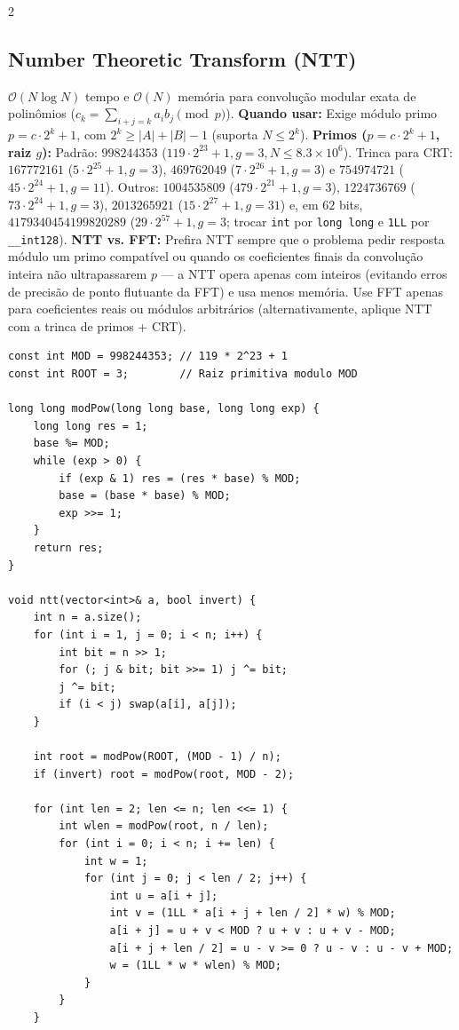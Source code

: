 \documentclass[11pt]{article}
\begin{document}
\begin{multicols}{2}
\subsection{Number Theoretic Transform (NTT)}
$\mathcal{O}(N \log N)$ tempo e $\mathcal{O}(N)$ memória para convolução modular exata de polinômios ($c_k = \sum_{i+j=k} a_i b_j \pmod p$). \textbf{Quando usar:} Exige módulo primo $p = c \cdot 2^k + 1$, com $2^k \ge |A| + |B| - 1$ (suporta $N \le 2^k$). \textbf{Primos ($p = c \cdot 2^k + 1$, raiz $g$):} Padrão: $998244353$ ($119 \cdot 2^{23} + 1, g = 3, N \le 8.3 \times 10^6$). Trinca para CRT: $167772161$ ($5 \cdot 2^{25} + 1, g = 3$), $469762049$ ($7 \cdot 2^{26} + 1, g = 3$) e $754974721$ ($45 \cdot 2^{24} + 1, g = 11$). Outros: $1004535809$ ($479 \cdot 2^{21} + 1, g = 3$), $1224736769$ ($73 \cdot 2^{24} + 1, g = 3$), $2013265921$ ($15 \cdot 2^{27} + 1, g = 31$) e, em $62$ bits, $4179340454199820289$ ($29 \cdot 2^{57} + 1, g = 3$; trocar \texttt{int} por \texttt{long long} e \texttt{1LL} por \texttt{\_\_int128}). \textbf{NTT vs. FFT:} Prefira NTT sempre que o problema pedir resposta módulo um primo compatível ou quando os coeficientes finais da convolução inteira não ultrapassarem $p$ — a NTT opera apenas com inteiros (evitando erros de precisão de ponto flutuante da FFT) e usa menos memória. Use FFT apenas para coeficientes reais ou módulos arbitrários (alternativamente, aplique NTT com a trinca de primos + CRT).
\begin{lstlisting}
const int MOD = 998244353; // 119 * 2^23 + 1
const int ROOT = 3;        // Raiz primitiva modulo MOD

long long modPow(long long base, long long exp) {
    long long res = 1;
    base %= MOD;
    while (exp > 0) {
        if (exp & 1) res = (res * base) % MOD;
        base = (base * base) % MOD;
        exp >>= 1;
    }
    return res;
}

void ntt(vector<int>& a, bool invert) {
    int n = a.size();
    for (int i = 1, j = 0; i < n; i++) {
        int bit = n >> 1;
        for (; j & bit; bit >>= 1) j ^= bit;
        j ^= bit;
        if (i < j) swap(a[i], a[j]);
    }

    int root = modPow(ROOT, (MOD - 1) / n);
    if (invert) root = modPow(root, MOD - 2);

    for (int len = 2; len <= n; len <<= 1) {
        int wlen = modPow(root, n / len);
        for (int i = 0; i < n; i += len) {
            int w = 1;
            for (int j = 0; j < len / 2; j++) {
                int u = a[i + j];
                int v = (1LL * a[i + j + len / 2] * w) % MOD;
                a[i + j] = u + v < MOD ? u + v : u + v - MOD;
                a[i + j + len / 2] = u - v >= 0 ? u - v : u - v + MOD;
                w = (1LL * w * wlen) % MOD;
            }
        }
    }


\end{lstlisting}
\end{multicols}
\end{document}
